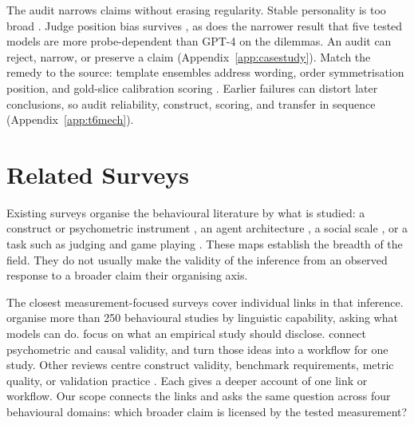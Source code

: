 \documentclass[11pt]{article}
\begin{document}
The audit narrows claims without erasing regularity. Stable personality is too
broad \cite{gupta2024self,shu2024dont,meyer2026apparent,song2025psychometric}.
Judge position bias survives \cite{shi2025judging,wang2024fair,li2025calibraeval},
as does the narrower result that five tested models are more probe-dependent
than GPT-4 on the dilemmas.
An audit can reject, narrow, or preserve a claim (Appendix~\ref{app:casestudy}).
Match the remedy to the source: template ensembles address wording, order
symmetrisation position, and gold-slice calibration scoring
\cite{voronov2024format,zhou2024batchcal,angelopoulos2023ppi}. Earlier failures
can distort later conclusions, so audit reliability, construct, scoring, and
transfer in sequence (Appendix~\ref{app:t6mech}).








\section{Related Surveys}
\label{sec:related}

Existing surveys organise the behavioural literature by what is studied: a
construct or psychometric instrument \cite{hagendorff2023machine,%
ye2025psychometrics,tseng2024persona}, an agent architecture
\cite{xi2023rise,wanglei2024autonomous}, a social scale
\cite{mou2024individual}, or a task such as judging and game playing
\cite{gu2024judge,yehudai2025evaluation,sun2025gametheory}. These maps establish
the breadth of the field. They do not usually make the validity of the inference
from an observed response to a broader claim their organising axis.

The closest measurement-focused surveys cover individual links in that
inference. \citet{chang2024behavior} organise more than 250 behavioural studies
by linguistic capability, asking what models can do. \citet{feuerriegel2026guide}
focus on what an empirical study should disclose. \citet{lin2025prompts} connect
psychometric and causal validity, and \citet{lin2026validity} turn those ideas
into a workflow for one study. Other reviews centre construct validity,
benchmark requirements, metric quality, or validation practice
\cite{laskar2024systematic,lohn2024requirements,xiao2023metriceval,%
bean2025measuring,larooij2025validation}. Each gives a deeper account of one
link or workflow. Our scope connects the links and asks the same question across
four behavioural domains: which broader claim is licensed by the tested
measurement?
\end{document}
